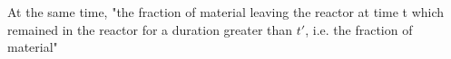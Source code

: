 At the same time, "the fraction of material leaving the reactor at time t which remained in the reactor for a duration greater than $t'$, i.e. the fraction of material"  